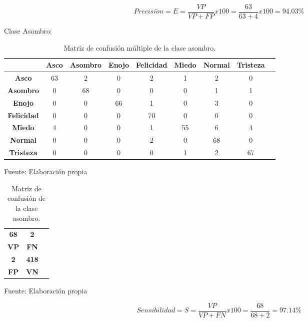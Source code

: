 \begin{equation}
Precisi\acute{o}n=E=\frac{VP}{VP+FP}x100=\frac{63}{63+4}x100=94.03\%
\end{equation}

\vskip 5cm

Clase Asombro:

\begin{table}[ht!]
\centering
\caption{Matriz de confusión múltiple de la clase asombro.} \vskip 0.1cm
\begin{tabular}{|c|c|c|c|c|c|c|c|c|} \hline
 & \bf Asco & \bf Asombro & \bf Enojo & \bf Felicidad & \bf Miedo & \bf Normal & \bf Tristeza \\ \hline
\bf Asco & 63 & 2 & 0 & 2 & 1 & 2 & 0 \\ \hline
\bf Asombro & 0 & 68 & 0 & 0 & 0 & 1 & 1 \\ \hline
\bf Enojo & 0 & 0 & 66 & 1 & 0 & 3 & 0 \\ \hline
\bf Felicidad & 0 & 0 & 0 & 70 & 0 & 0 & 0 \\ \hline
\bf Miedo & 4 & 0 & 0 & 1 & 55 & 6 & 4 \\ \hline
\bf Normal & 0 & 0 & 0 & 2 & 0 & 68 & 0 \\ \hline
\bf Tristeza & 0 & 0 & 0 & 0 & 1 & 2 & 67 \\ \hline

\end{tabular}
\begin{center}
{\small{Fuente: Elaboración propia}}
\end{center}
\end{table}

\begin{table}[ht!]
\centering
\caption{Matriz de confusión de la clase asombro.} \vskip 0.1cm
\begin{tabular}{|c|c|c|} \hline
\bf 68 \par & \bf 2 \par \\
\bf VP & \bf FN \\ \hline
\bf 2 \par & \bf 418 \par \\ 
\bf FP & \bf VN \\ \hline 
\end{tabular}
\begin{center}
{\small{Fuente: Elaboración propia}}
\end{center}
\end{table}

\begin{equation}
Sensibilidad=S=\frac{VP}{VP+FN}x100=\frac{68}{68+2}=97.14\%
\end{equation}

